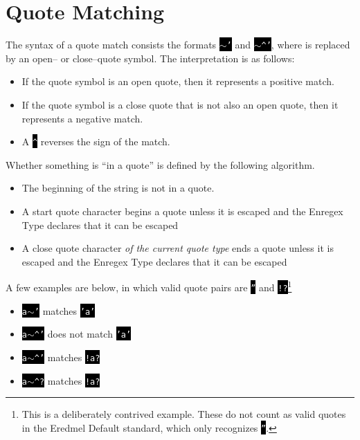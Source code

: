 \message{ !name(Eredmel_Specification_1_0.tex)}\documentclass{book}
\newcommand\code\texttt
\newcommand{\codebox}[1]{\colorbox{black}{\textcolor{white}{\code{#1}}}}
\newcommand{\til}{$\sim$}
\begin{document}
\section{Quote Matching}
The syntax of a quote match consists the formats \codebox{\til'} and \codebox{\til\^{}'}, where  is replaced by an open-- or close--quote symbol. The interpretation is as follows:

\begin{itemize}
\item If the quote symbol is an open quote, then it represents a positive match.
\item If the quote symbol is a close quote that is not also an open quote, then it represents a negative match.
\item A \codebox{\^{}} reverses the sign of the match.
\end{itemize}

Whether something is ``in a quote'' is defined by the following algorithm.

\begin{itemize}
\item The beginning of the string is not in a quote.
\item A start quote character begins a quote unless it is escaped and the Enregex Type declares that it can be escaped
\item A close quote character \emph{of the current quote type} ends a quote unless it is escaped and the Enregex Type declares that it can be escaped
\end{itemize}

A few examples are below, in which valid quote pairs are \codebox{''} and \codebox{!?}\footnote{This is a deliberately contrived example. These do not count as valid quotes in the Eredmel Default standard, which only recognizes \codebox{''}.}

\begin{itemize}
\item \codebox{a\til'} matches \codebox{'a'}
\item \codebox{a\til\^{}'} does not match \codebox{'a'}
\item \codebox{a\til\^{}'} matches \codebox{!a?}
\item \codebox{a\til\^{}?} matches \codebox{!a?}
\end{itemize}


\end{document}
